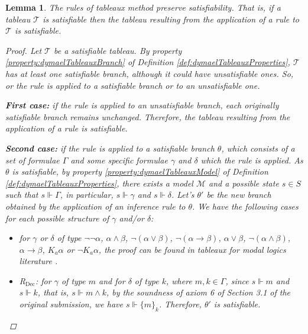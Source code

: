 \documentclass[submission,copyright,creativecommons]{eptcs}
\newtheorem{lemma}[definition]{Lemma}
\begin{document}
        \begin{lemma}
            The rules of tableaux method preserve satisfiability. That is, if a tableau $\mathscr{T}$ is satisfiable then the tableau resulting from the application of a rule to $\mathscr{T}$ is satisfiable.
        
        \begin{proof}
            Let $\mathscr{T}$ be a satisfiable tableau. By property \ref{property:dymaelTableauxBranch} of Definition \ref{def:dymaelTableauxProperties}, $\mathscr{T}$ has at least one satisfiable branch, although it could have unsatisfiable ones. So, or the rule is applied to a satisfiable branch or to an unsatisfiable one.
        
            \textbf{First case:} if the rule is applied to an unsatisfiable branch, each originally satisfiable branch remains unchanged. Therefore, the tableau resulting from the application of a rule is satisfiable.
        
            \textbf{Second case:} if the rule is applied to a satisfiable branch $\theta$, which consists of a set of formulae $\Gamma$ and some specific formulae $\gamma$ and $\delta$ which the rule is applied. As $\theta$ is satisfiable, by property \ref{property:dymaelTableauxModel} of Definition \ref{def:dymaelTableauxProperties}, there exists a model $\mathscr{M}$ and a possible state $s \in S$ such that $s \Vdash \Gamma$, in particular, $s \Vdash \gamma$ and $s \Vdash \delta$. Let's $\theta'$ be the new branch obtained by the application of an inference rule to $\theta$. We have the following cases for each possible structure of $\gamma$ and/or $\delta$:
        
            \begin{itemize}
                \item for $\gamma$ or $\delta$ of type $\neg \neg \alpha$, $\alpha \land \beta$, $\neg (\alpha \lor \beta)$, $\neg (\alpha \to \beta)$, $\alpha \lor \beta$, $\neg (\alpha \land \beta)$, $\alpha \to \beta$, $K_a \alpha$ or $\neg K_a \alpha$, the proof can be found in tableaux for modal logics literature \cite{fitting1986proofmethods, IntroducaoLogicaModalAplicadaComputacao}.
                
                \item R$_\text{Dec}$: for $\gamma$ of type $m$ and for $\delta$ of type $k$, where $m, k \in \Gamma$, since $s \Vdash m$ and $s \Vdash k$, that is, $s \Vdash m \land k$, by the soundness of axiom 6 of Section 3.1 of the original submission, we have $s \Vdash \{m\}_k$. Therefore, $\theta'$ is satisfiable.
        

\end{itemize}
\end{proof}
\end{lemma}
\end{document}
